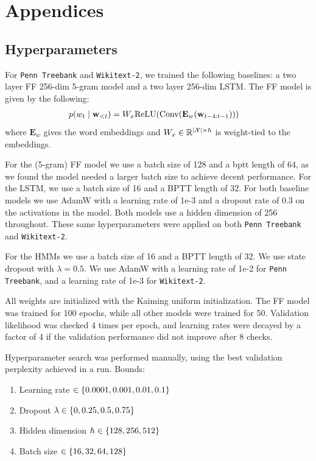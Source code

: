 \documentclass[11pt,a4paper]{article}
\begin{document}



\clearpage
\appendix

\section{Appendices}
\subsection{Hyperparameters}
\label{sec:hyperparams}

For \texttt{Penn Treebank} and \texttt{Wikitext-2}, we trained the following baselines:
a two layer FF 256-dim 5-gram model and a two layer 256-dim LSTM.
The FF model is given by the following:
\begin{equation}
\begin{aligned}
p(w_t \mid \mathbf{w}_{<t})
&= W_x\textrm{ReLU}(\textrm{Conv}(\mathbf{E}_w(\mathbf{w}_{t-4:t-1})))
\end{aligned}
\end{equation}
where $\mathbf{E}_w$ gives the word embeddings and
$W_x\in\mathbb{R}^{|\mathcal{X}|\times h}$ is weight-tied to the embeddings.

For the (5-gram) FF model we use a batch size of 128 and a bptt length of 64,
as we found the model needed a larger batch size to achieve decent performance.
For the LSTM, we use a batch size of 16 and a BPTT length of 32.
For both baseline models we use AdamW \citep{adamw} with a learning rate of 1e-3 and a dropout rate of 0.3 on the activations in the model.
Both models use a hidden dimension of 256 throughout.
These same hyperparameters were applied on both \texttt{Penn Treebank} and \texttt{Wikitext-2}.

For the HMMs we use a batch size of 16 and a BPTT length of 32.
We use state dropout with $\lambda = 0.5$.
We use AdamW \citep{adamw} with a learning rate of 1e-2 for \texttt{Penn Treebank},
and a learning rate of 1e-3 for \texttt{Wikitext-2}.

All weights are initialized with the Kaiming uniform initialization.
The FF model was trained for 100 epochs, while all other models were trained for 50.
Validation likelihood was checked 4 times per epoch, and
learning rates were decayed by a factor of 4 if the validation performance
did not improve after 8 checks.

Hyperparameter search was performed manually, using the best
validation perplexity achieved in a run.
Bounds:
\begin{enumerate}
\item Learning rate $\in \left\{0.0001, 0.001, 0.01, 0.1\right\}$
\item Dropout $\lambda \in \left\{0, 0.25, 0.5, 0.75\right\}$
\item Hidden dimension $h \in \left\{128,256,512\right\}$
\item Batch size $\in \left\{16, 32, 64, 128\right\}$
\end{enumerate}
\end{document}
